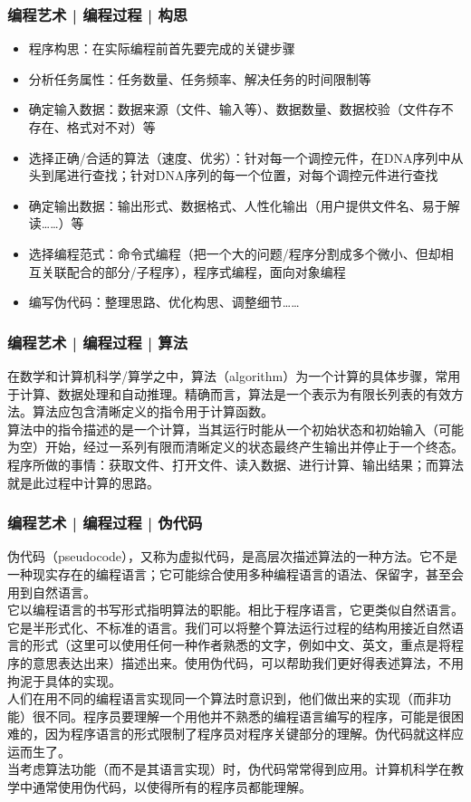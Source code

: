 \begin{frame}
  \frametitle{编程艺术 | 编程过程 | \alert{构思}}
  \begin{itemize}
    \item 程序构思：在实际编程前首先要完成的关键步骤
    \item 分析任务属性：任务数量、任务频率、解决任务的时间限制等
    \item 确定输入数据：数据来源（文件、输入等）、数据数量、数据校验（文件存不存在、格式对不对）等
    \item 选择正确/合适的算法（速度、优劣）：针对每一个调控元件，在DNA序列中从头到尾进行查找；针对DNA序列的每一个位置，对每个调控元件进行查找
    \item 确定输出数据：输出形式、数据格式、人性化输出（用户提供文件名、易于解读……）等
    \item 选择编程范式：命令式编程（把一个大的问题/程序分割成多个微小、但却相互关联配合的部分/子程序），程序式编程，面向对象编程
    \item 编写伪代码：整理思路、优化构思、调整细节……
  \end{itemize}
\end{frame}

\begin{frame}
  \frametitle{编程艺术 | 编程过程 | 算法}
  在数学和计算机科学/算学之中，算法（algorithm）为一个计算的具体步骤，常用于计算、数据处理和自动推理。精确而言，算法是一个表示为有限长列表的有效方法。算法应包含清晰定义的指令用于计算函数。\\
  \vspace{1em}
  算法中的指令描述的是一个计算，当其运行时能从一个初始状态和初始输入（可能为空）开始，经过一系列有限而清晰定义的状态最终产生输出并停止于一个终态。\\
  \vspace{1em}
  程序所做的事情：获取文件、打开文件、读入数据、进行计算、输出结果；而算法就是此过程中计算的思路。
\end{frame}

\begin{frame}
  \frametitle{编程艺术 | 编程过程 | 伪代码}
  伪代码（pseudocode），又称为虚拟代码，是高层次描述算法的一种方法。它不是一种现实存在的编程语言；它可能综合使用多种编程语言的语法、保留字，甚至会用到自然语言。\\
  \vspace{1em}
  它以编程语言的书写形式指明算法的职能。相比于程序语言，它更类似自然语言。它是半形式化、不标准的语言。我们可以将整个算法运行过程的结构用接近自然语言的形式（这里可以使用任何一种作者熟悉的文字，例如中文、英文，重点是将程序的意思表达出来）描述出来。使用伪代码，可以帮助我们更好得表述算法，不用拘泥于具体的实现。\\
  \vspace{1em}
  人们在用不同的编程语言实现同一个算法时意识到，他们做出来的实现（而非功能）很不同。程序员要理解一个用他并不熟悉的编程语言编写的程序，可能是很困难的，因为程序语言的形式限制了程序员对程序关键部分的理解。伪代码就这样应运而生了。\\
  \vspace{1em}
  当考虑算法功能（而不是其语言实现）时，伪代码常常得到应用。计算机科学在教学中通常使用伪代码，以使得所有的程序员都能理解。
\end{frame}

